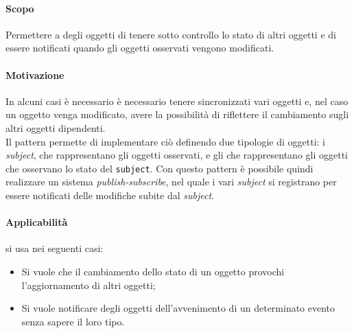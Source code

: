 \paragraph{Scopo}
Permettere a degli oggetti di tenere sotto controllo lo stato di altri oggetti e di essere notificati quando gli oggetti osservati vengono modificati.
\paragraph{Motivazione}
In alcuni casi è necessario è necessario tenere sincronizzati vari oggetti e, nel caso un oggetto venga modificato, avere la possibilità di riflettere il cambiamento sugli altri oggetti dipendenti. \\
Il pattern  permette di implementare ciò definendo due tipologie di oggetti: i \textit{subject}, che rappresentano gli oggetti osservati, e gli \textit{} che rappresentano gli oggetti che osservano lo stato del \texttt{subject}.
Con questo pattern è possibile quindi realizzare un sistema \textit{publish-subscribe}, nel quale i vari \textit{subject} si registrano per essere notificati delle modifiche subite dal \textit{subject}.\\
\paragraph{Applicabilità}
\textit{} si usa nei seguenti casi:
\begin{itemize}
\item Si vuole che il cambiamento dello stato di un oggetto provochi l'aggiornamento di altri oggetti;
\item Si vuole notificare degli oggetti dell'avvenimento di un determinato evento senza sapere il loro tipo.
\end{itemize}
